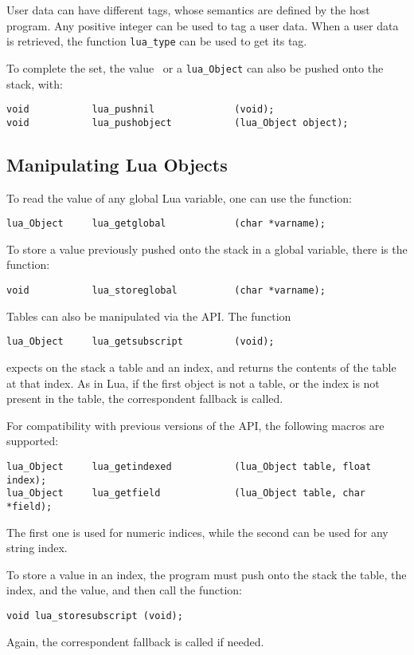 User data can have different tags,
whose semantics are defined by the host program.
Any positive integer can be used to tag a user data.
When a user data is retrieved,
the function \verb'lua_type' can be used to get its tag.

To complete the set,
the value \nil\ or a \verb'lua_Object' can also be pushed onto the stack,
with:
\begin{verbatim}
void           lua_pushnil              (void);
void           lua_pushobject           (lua_Object object);
\end{verbatim}


\subsection{Manipulating Lua Objects}
To read the value of any global Lua variable,
one can use the function:
\begin{verbatim}
lua_Object     lua_getglobal            (char *varname);
\end{verbatim}
To store a value previously pushed onto the stack in a global variable,
there is the function:
\begin{verbatim}
void           lua_storeglobal          (char *varname);
\end{verbatim}

Tables can also be manipulated via the API.
The function
\begin{verbatim}
lua_Object     lua_getsubscript         (void);
\end{verbatim}
expects on the stack a table and an index,
and returns the contents of the table at that index.
As in Lua, if the first object is not a table,
or the index is not present in the table,
the correspondent fallback is called.

For compatibility with previous versions of the API,
the following macros are supported:
\begin{verbatim}
lua_Object     lua_getindexed           (lua_Object table, float index);
lua_Object     lua_getfield             (lua_Object table, char *field);
\end{verbatim}
The first one is used for numeric indices,
while the second can be used for any string index.

To store a value in an index,
the program must push onto the stack the table, the index,
and the value,
and then call the function:
\begin{verbatim}
void lua_storesubscript (void);
\end{verbatim}
Again, the correspondent fallback is called if needed.

